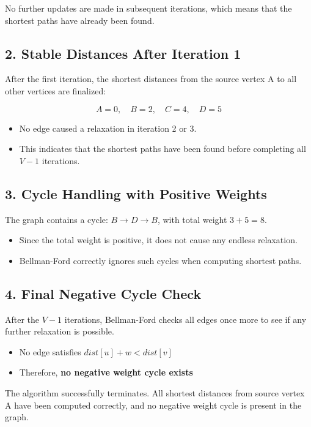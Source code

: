 \documentclass[14pt,a4paper]{extarticle}
\begin{document}
No further updates are made in subsequent iterations, which means that the shortest paths have already been found.

\subsection*{2. Stable Distances After Iteration 1}

After the first iteration, the shortest distances from the source vertex A to all other vertices are finalized:

\[
\boxed{
A = 0, \quad B = 2, \quad C = 4, \quad D = 5
}
\]

\begin{itemize}
    \item No edge caused a relaxation in iteration 2 or 3.
    \item This indicates that the shortest paths have been found before completing all $V-1$ iterations.
\end{itemize}

\subsection*{3. Cycle Handling with Positive Weights}

The graph contains a cycle: $B \rightarrow D \rightarrow B$, with total weight $3 + 5 = 8$.

\begin{itemize}
    \item Since the total weight is positive, it does not cause any endless relaxation.
    \item Bellman-Ford correctly ignores such cycles when computing shortest paths.
\end{itemize}

\subsection*{4. Final Negative Cycle Check}

After the $V-1$ iterations, Bellman-Ford checks all edges once more to see if any further relaxation is possible.

\begin{itemize}
    \item No edge satisfies $dist[u] + w < dist[v]$
    \item Therefore, \textbf{no negative weight cycle exists}
\end{itemize}

\begin{tcolorbox}[colback=white, colframe=black, title=Conclusion]
The algorithm successfully terminates. All shortest distances from source vertex A have been computed correctly, and no negative weight cycle is present in the graph.
\end{tcolorbox}
\end{document}
